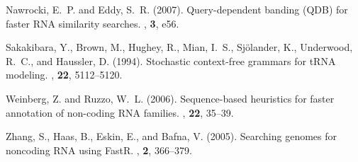 \documentclass{bioinfo}
\begin{document}
\begin{application}
\begin{thebibliography}{}
Nawrocki, E.~P. and Eddy, S.~R. (2007).
\newblock Query-dependent banding ({QDB}) for faster {RNA} similarity searches.
, {\bf 3}, e56.

Sakakibara, Y., Brown, M., Hughey, R., Mian, I.~S., Sj{\"{o}}lander, K.,
  Underwood, R.~C., and Haussler, D. (1994).
\newblock Stochastic context-free grammars for {tRNA} modeling.
, {\bf 22}, 5112--5120.

Weinberg, Z. and Ruzzo, W.~L. (2006).
\newblock Sequence-based heuristics for faster annotation of non-coding {RNA}
  families.
, {\bf 22}, 35--39.

Zhang, S., Haas, B., Eskin, E., and Bafna, V. (2005).
\newblock Searching genomes for noncoding {RNA} using {FastR}.
, {\bf 2}, 366--379.

\end{thebibliography}

\end{application}
\end{document}
